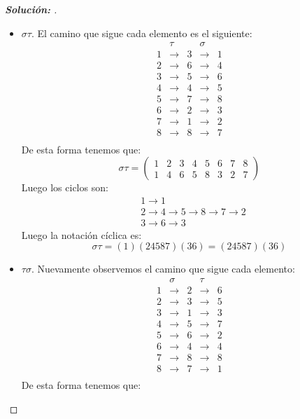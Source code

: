 \documentclass[12pt]{article}
\begin{document}
\begin{enumerate}
\begin{proof}[\textbf{Solución: }]
    \begin{itemize}
        \item $\sigma\tau$. El camino que sigue cada elemento es el siguiente:
        $$\begin{matrix}
              &\tau& &\sigma& \\
            1 &\to &3&\to   &1\\
            2 &\to &6&\to   &4\\
            3 &\to &5&\to   &6\\
            4 &\to &4&\to   &5\\
            5 &\to &7&\to   &8\\
            6 &\to &2&\to   &3\\
            7 &\to &1&\to   &2\\
            8 &\to &8&\to   &7\\
        \end{matrix}$$
        De esta forma tenemos que:
        $$\sigma\tau=\begin{pmatrix}
         1 & 2 & 3 & 4 & 5 & 6 & 7 & 8\\ 
         1 & 4 & 6 & 5 & 8 & 3 & 2 & 7
        \end{pmatrix}$$
        Luego los ciclos son:
        \begin{align*}
            &1\to1\\
            &2\to4\to5\to8\to7\to2\\
            &3\to6\to3
        \end{align*}
        Luego la notación cíclica es:
        $$\sigma\tau=(1)(24587)(36)=(24587)(36)$$
        \item $\tau\sigma$. Nuevamente observemos el camino que sigue cada elemento:
        $$\begin{matrix}
              &\sigma& &\tau& \\
            1 &\to &2&\to   &6\\
            2 &\to &3&\to   &5\\
            3 &\to &1&\to   &3\\
            4 &\to &5&\to   &7\\
            5 &\to &6&\to   &2\\
            6 &\to &4&\to   &4\\
            7 &\to &8&\to   &8\\
            8 &\to &7&\to   &1\\
        \end{matrix}$$
        De esta forma tenemos que: $$
$$
\end{itemize}
\end{proof}
\end{enumerate}
\end{document}
